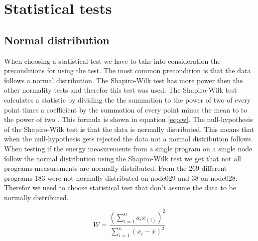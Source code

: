\chapter{Statistical tests}
\label{ch:statistics}


\section{Normal distribution}
When choosing a statistical test we have to take into consideration the preconditions for using the test. The most common precondition is that the data follows a normal distribution. The Shapiro-Wilk test has more power then the other normality tests \cite{razali2011power} and therefor this test was used. The Shapiro-Wilk test calculates a statistic by dividing the the summation to the power of two of every point times a coefficient by the summation of  every point minus the mean to to the power of two \cite{shapiro1965analysis}. This formula is shown in equation \ref{eq:sw}. The null-hypothesis of the Shapiro-Wilk test is that the data is normally distributed. This means that when the null-hypothesis gets rejected the data not a normal distribution follows. When testing if the energy measurements from a single program on a single node follow the normal distribution using the Shapiro-Wilk test we get that not all programs measurements are normally distributed. From the 269 different programs 183 were not normally distributed on node029 and 38 on node028. Therefor we need to choose statistical test that don't assume the data to be normally distributed.

\begin{equation}
    W = \frac{(\sum_{i=1}^{n} a_{i}x_{(i)})^2}{\sum_{i=1}^{n} (x_{i} - \bar x)^2}
    \label{eq:sw}
\end{equation}



